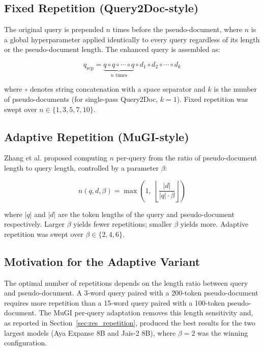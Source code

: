 \subsection{Fixed Repetition (Query2Doc-style)}
The original query is prepended $n$ times before the pseudo-document, where $n$ is a global hyperparameter applied identically to every query regardless of its length or the pseudo-document length. The enhanced query is assembled as:

\begin{equation}
    q_{\text{rep}} = \underbrace{q \circ q \circ \cdots \circ q}_{n \text{ times}} \circ d_1 \circ d_2 \circ \cdots \circ d_k
    \label{eq:query_repetition}
\end{equation}

\noindent where $\circ$ denotes string concatenation with a space separator and $k$ is the number of pseudo-documents (for single-pass Query2Doc, $k=1$). Fixed repetition was swept over $n \in \{1, 3, 5, 7, 10\}$.

\subsection{Adaptive Repetition (MuGI-style)}
Zhang et al. \cite{zhang_2024_mugi} proposed computing $n$ per-query from the ratio of pseudo-document length to query length, controlled by a parameter $\beta$:

\begin{equation}
    n(q, d, \beta) = \max\!\left(1,\; \left\lfloor \dfrac{|d|}{|q| \cdot \beta} \right\rfloor \right)
    \label{eq:mugi_repetition}
\end{equation}

\noindent where $|q|$ and $|d|$ are the token lengths of the query and pseudo-document respectively. Larger $\beta$ yields fewer repetitions; smaller $\beta$ yields more. Adaptive repetition was swept over $\beta \in \{2, 4, 6\}$.

\subsection{Motivation for the Adaptive Variant}
The optimal number of repetitions depends on the length ratio between query and pseudo-document. A 3-word query paired with a 200-token pseudo-document requires more repetition than a 15-word query paired with a 100-token pseudo-document. The MuGI per-query adaptation removes this length sensitivity and, as reported in Section~\ref{sec:res_repetition}, produced the best results for the two largest models (Aya Expanse 8B and Jais-2 8B), where $\beta=2$ was the winning configuration.

